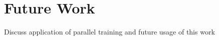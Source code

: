 \section{Future Work}
\label{Future}

Discuss application of parallel training and future usage of this work